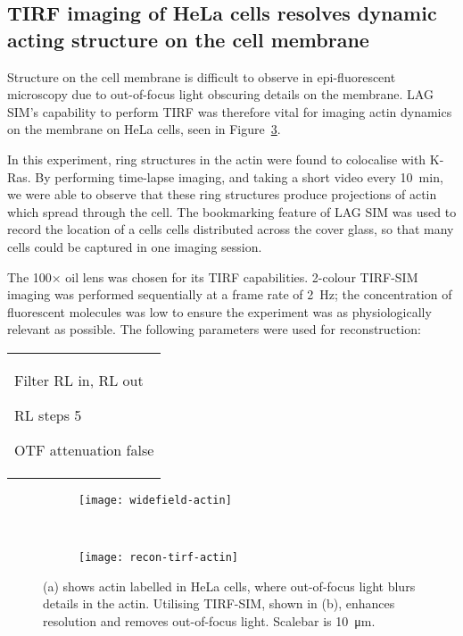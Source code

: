\subsection{TIRF imaging of HeLa cells resolves dynamic acting structure on the cell membrane}
Structure on the cell membrane is difficult to observe in epi-fluorescent microscopy due to out-of-focus light obscuring details on the membrane. 
LAG SIM's capability to perform TIRF was therefore vital for imaging actin dynamics on the membrane on HeLa cells, seen in Figure~\ref{fig:recon-actin}. 

In this experiment, ring structures in the actin were found to colocalise with K-Ras. 
By performing time-lapse imaging, and taking a short video every \SI{10}{\minute}, we were able to observe that these ring structures produce projections of actin which spread through the cell. 
The bookmarking feature of LAG SIM was used to record the location of a cells cells distributed across the cover glass, so that many cells could be captured in one imaging session. 

The 100$\times$ oil lens was chosen for its TIRF capabilities. 
2-colour TIRF-SIM imaging was performed sequentially at a frame rate of \SI{2}{\hertz}; the concentration of fluorescent molecules was low to ensure the experiment was as physiologically relevant as possible. 
The following parameters were used for reconstruction: \newline
\begin{tabular}{p{}}
\begin{labelling}[margin=OTF attenuation]
	\item[Filter] RL in, RL out
	\item[RL steps] 5
	\item[OTF attenuation] false
\end{labelling}
\end{tabular}


\begin{figure}[tbp!]
\centering
\begin{subfigure}[b]{0.7\textwidth}
	\texttt{[image: widefield-actin]}
	\caption{}\label{fig:widefield-actin}
\end{subfigure}

~\newline
\begin{subfigure}[b]{0.7\textwidth}
	\texttt{[image: recon-tirf-actin]}
	\caption{}\label{fig:recon-tirf-actin}
\end{subfigure}
\caption[LAG SIM: TIRF imaging of actin in HeLa cells removes out-of-focus light]{(a) shows actin labelled in HeLa cells, where out-of-focus light blurs details in the actin. Utilising TIRF-SIM, shown in (b), enhances resolution and removes out-of-focus light. Scalebar is \SI{10}{\micro\metre}. }
\label{fig:recon-actin}
\end{figure}

